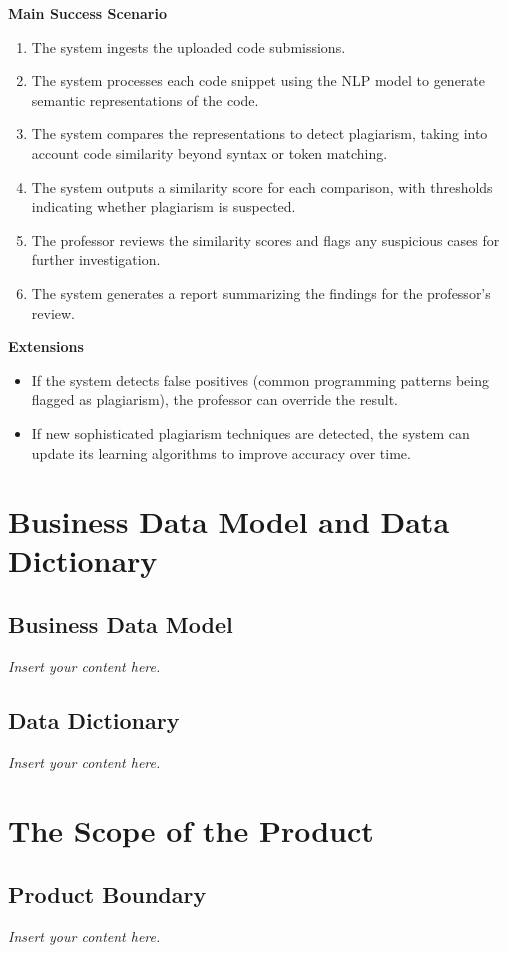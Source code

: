 \documentclass[12pt]{article}
\newcommand{\lips}{\textit{Insert your content here.}}
\begin{document}
\textbf{Main Success Scenario}
\begin{enumerate}
    \item The system ingests the uploaded code submissions.
    \item The system processes each code snippet using the NLP model to generate semantic representations of the code.
    \item The system compares the representations to detect plagiarism, taking into account code similarity beyond syntax or token matching.
    \item The system outputs a similarity score for each comparison, with thresholds indicating whether plagiarism is suspected.
    \item The professor reviews the similarity scores and flags any suspicious cases for further investigation.
    \item The system generates a report summarizing the findings for the professor’s review.
\end{enumerate}

\textbf{Extensions}
\begin{itemize}
    \item If the system detects false positives (common programming patterns being flagged as plagiarism), the professor can override the result.
    \item If new sophisticated plagiarism techniques are detected, the system can update its learning algorithms to improve accuracy over time.
\end{itemize}

\section{Business Data Model and Data Dictionary}
\subsection{Business Data Model}
\lips
\subsection{Data Dictionary}
\lips

\section{The Scope of the Product}
\subsection{Product Boundary}
\lips
\end{document}
